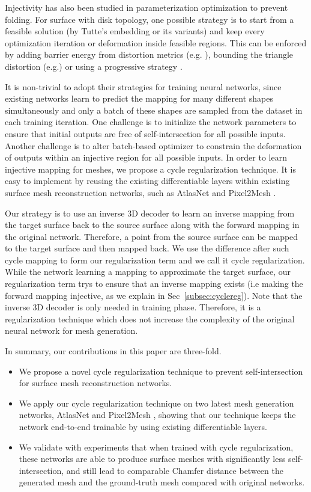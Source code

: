Injectivity has also been studied in parameterization optimization to prevent folding. For surface with disk topology, one possible strategy is to start from a feasible solution (by Tutte's embedding \cite{tutte} or its variants) and keep every optimization iteration or deformation inside feasible regions. This can be enforced by adding barrier energy from distortion metrics (e.g. \cite{provableplanarmapping,lifted_bijection}), bounding the triangle distortion (e.g.\cite{freeboundary,boundeddistortion})
or using a progressive strategy \cite{Liu_PP_2018}. 

It is non-trivial to adopt their strategies for training neural networks, since existing networks learn to predict the mapping for many different shapes simultaneously and only a batch of these shapes are sampled from the dataset in each training iteration. One challenge is to initialize the network parameters to ensure that initial outputs are free of self-intersection for all possible inputs. Another challenge is to alter batch-based optimizer to constrain the deformation of outputs within an injective region for all possible inputs. In order to learn injective mapping for meshes, we propose a cycle regularization technique. It is easy to implement by reusing the existing differentiable layers within existing surface mesh reconstruction networks, such as AtlasNet \cite{atlasnet} and Pixel2Mesh \cite{pixel2mesh}.

 Our strategy is to use an inverse 3D decoder to learn an inverse mapping from  the target surface back to the source surface along with the forward mapping in the original network. Therefore, a point from the source surface can be mapped to the target surface and then mapped back. We use the difference after such cycle mapping to form our regularization term and we call it cycle regularization. While the network learning a mapping to approximate the target surface, our regularization term trys to ensure that an inverse mapping exists (i.e making the forward mapping injective, as we explain in Sec~\ref{subsec:cyclereg}).
Note that the inverse 3D decoder is only needed in training phase. Therefore, it is a regularization technique which does not increase the complexity of the original neural network for mesh generation.

In summary, our contributions in this paper are three-fold.
\begin{itemize}
	\item We propose a novel cycle regularization technique to prevent self-intersection for surface mesh reconstruction networks. 
	\item We apply our cycle regularization technique on two latest mesh generation networks, AtlasNet \cite{atlasnet} and Pixel2Mesh \cite{pixel2mesh}, showing that our technique keeps the network end-to-end trainable by using existing differentiable layers.
	\item We validate with experiments that when trained with cycle regularization, these networks are able to produce surface meshes with significantly less self-intersection, and still lead to comparable  Chamfer distance between the generated mesh and the ground-truth mesh compared with original networks. 
\end{itemize}

 